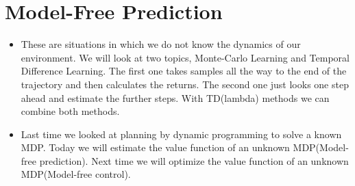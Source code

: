 \documentclass[a4paper]{article}
\begin{document}
\section{Model-Free Prediction}
\begin{itemize}
    \item These are situations in which we do not know the dynamics of our environment. We will look at two topics, Monte-Carlo Learning and Temporal Difference Learning. The first one takes samples all the way to the end of the trajectory and then calculates the returns. The second one just looks one step ahead and estimate the further steps. With TD(lambda) methods we can combine both methods. 
    \item Last time we looked at planning by dynamic programming to solve a known MDP. Today we will estimate the value function of an unknown MDP(Model-free prediction). Next time we will optimize the value function of an unknown MDP(Model-free control). 
\end{itemize}
\end{document}
